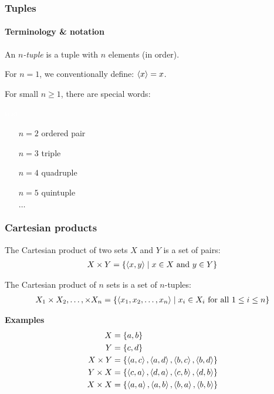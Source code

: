 \documentclass[fleqn,10pt,serif,xcolor=svgnames,xcolor=table,aspectratio=169,handout]{beamer}
\begin{document}
\begin{frame}
  \frametitle{Tuples}
  \framesubtitle{Terminology \& notation}

  An \textit{$n$-tuple} is a tuple with $n$ elements (in order).


  For $n=1$, we conventionally define: $\left \langle x\right\rangle = x$.

  For small $n \ge 1$, there are special words:

  \medskip

  \begin{minipage}{0.15\linewidth}
    \textcolor{white}{test}
  \end{minipage}
  \begin{minipage}{0.4\linewidth}
    \begin{itemize}
      \item[$n=2$] ordered pair
      \item[$n=3$] triple
      \item[$n=4$] quadruple
      \item[$n=5$] quintuple
      \item[] $\dots$
    \end{itemize}
  \end{minipage}
\end{frame}

\begin{frame}
  \frametitle{Cartesian products}

  The Cartesian product of two sets $X$ and $Y$ is a set of pairs:
  \begin{align*}
    X \times Y = \left\{\left \langle x,y\right\rangle \mid x \in X \text{ and } y \in Y\right\}
  \end{align*}

  \bigskip \pause

  The Cartesian product of $n$ sets is a set of $n$-tuples:
  \begin{align*}
    X_{1} \times X_{2}, \dots, \times X_{n} = \left\{\left \langle x_{1},x_{2}, \dots, x_{n}\right\rangle \mid x_{i} \in X_{i} \text{ for all } 1 \le i \le n\right\}
  \end{align*}


  \bigskip \pause

  {\textbf{{\color{themecolor}Examples}}}
  \begin{align*}
    X &= \left\{a,b\right\} \\
    Y &= \left\{c,d\right\} \\
    X \times Y & = \left\{\left \langle a,c\right\rangle, \left \langle a,d\right\rangle, \left \langle b,c\right\rangle, \left \langle b,d\right\rangle\right\} \\
    Y \times X & = \left\{\left \langle c,a\right\rangle, \left \langle d,a\right\rangle, \left \langle c,b\right\rangle, \left \langle d,b\right\rangle\right\} \\
    X \times X & = \left\{\left \langle a,a\right\rangle, \left \langle a,b\right\rangle, \left \langle b,a\right\rangle, \left \langle b,b\right\rangle\right\} \\
  \end{align*}

\end{frame}
\end{document}
